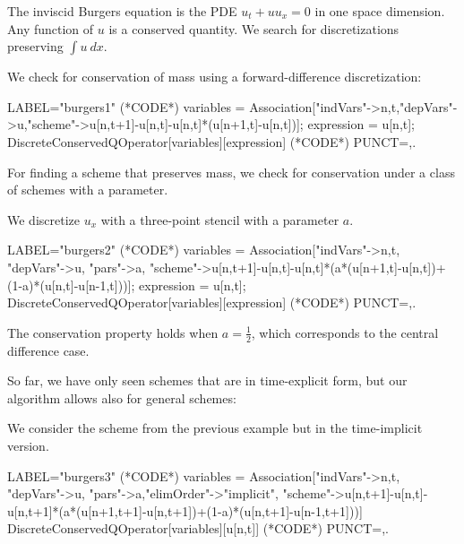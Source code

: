 \documentclass[runningheads]{llncs}
\newcommand{\1}{\chi}
\begin{document}
The inviscid Burgers equation is the PDE $u_t+uu_x=0$ \cite{smoller94} in one space dimension. Any function of $u$ is a conserved quantity. We search for discretizations preserving $\int u\ dx$.
\begin{example}
	We check for conservation of mass using a forward-difference discretization:
	\begin{EXE}
		LABEL="burgers1"
		(*CODE*)
		variables = Association["indVars"->{n,t},"depVars"->{u},"scheme"->{u[n,t+1]-u[n,t]-u[n,t]*(u[n+1,t]-u[n,t])}];
		expression = u[n,t];
		DiscreteConservedQOperator[variables][expression]
		(*CODE*)
		PUNCT={,.}
	\end{EXE}
	\begin{small}
		
		
	\end{small}
\end{example}
For finding a scheme that preserves mass, we check for conservation under a class of schemes with a parameter.
\begin{example}
	We discretize $u_x$ with a three-point stencil with a parameter $a$.
	\begin{EXE}
		LABEL="burgers2"
		(*CODE*)
		variables = Association["indVars"->{n,t}, "depVars"->{u}, "pars"->{a}, "scheme"->{u[n,t+1]-u[n,t]-u[n,t]*(a*(u[n+1,t]-u[n,t])+(1-a)*(u[n,t]-u[n-1,t]))}];
		expression = u[n,t];
		DiscreteConservedQOperator[variables][expression]
		(*CODE*)
		PUNCT={,.}
	\end{EXE}
	\begin{small}
		
		
	\end{small}
The conservation property holds when $a=\frac{1}{2}$, which corresponds to the central difference case.
\end{example}
So far, we have only seen schemes that are in time-explicit form, but our algorithm allows also for general schemes:
\begin{example}
	We consider the scheme from the previous example but in the time-implicit version.
	\begin{EXE}
		LABEL="burgers3"
		(*CODE*)
		variables = Association["indVars"->{n,t}, "depVars"->{u}, "pars"->{a},"elimOrder"->"implicit", "scheme"->{u[n,t+1]-u[n,t]-u[n,t+1]*(a*(u[n+1,t+1]-u[n,t+1])+(1-a)*(u[n,t+1]-u[n-1,t+1]))}]
		DiscreteConservedQOperator[variables][u[n,t]]
		(*CODE*)
		PUNCT={,.}
	\end{EXE}
	\begin{small}
		
		
	\end{small}
\end{example}
\end{document}
